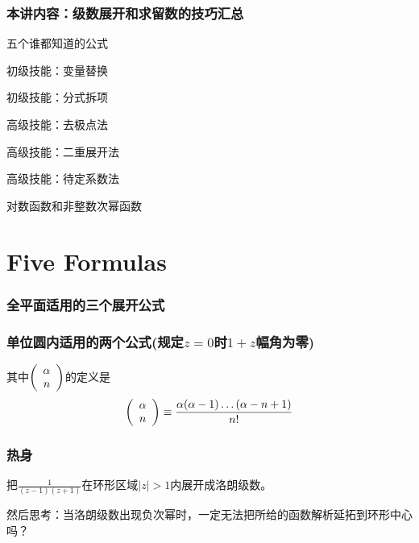 \documentclass[CJK,13pt]{beamer}
\date{}
\begin{document}
\bch
{}


\begin{frame}
\frametitle{本讲内容：级数展开和求留数的技巧汇总}

\bitem
\item{五个谁都知道的公式}
\item{初级技能：变量替换}
\item{初级技能：分式拆项}
\item{高级技能：去极点法}
\item{高级技能：二重展开法}  
\item{高级技能：待定系数法}
\item{对数函数和非整数次幂函数}
 \eitem

\end{frame}


\section{Five Formulas}

\begin{frame}
  \frametitle{  全平面适用的三个展开公式}
  
  
  
\end{frame}

\begin{frame}
  \frametitle{  {\bf 单位圆内适用}的两个公式(规定$z=0$时$1+z$幅角为零)}
  
  其中$\left(\begin{array}{c}\alpha\\ n\end{array}\right)$的定义是$$\left(\begin{array}{c}\alpha\\ n\end{array}\right) \equiv \frac{\alpha(\alpha-1)\ldots(\alpha-n+1)}{n!}$$
  
\end{frame}



\begin{frame}
  \frametitle{热身}
  

  把$\frac{1}{(z-1)(z+1)}$在环形区域$|z|>1$内展开成洛朗级数。

  \skiplines

  然后思考：当洛朗级数出现负次幂时，一定无法把所给的函数解析延拓到环形中心吗？

  
\end{frame}
\end{document}
